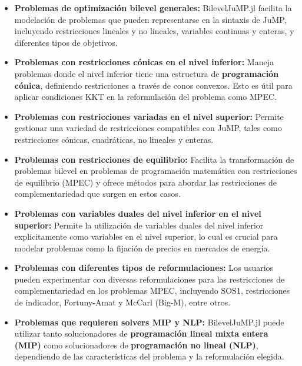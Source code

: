 \begin{itemize}
    \item \textbf{Problemas de optimización bilevel generales:} BilevelJuMP.jl facilita la modelación de problemas que pueden representarse en la sintaxis de JuMP, incluyendo restricciones lineales y no lineales, variables continuas y enteras, y diferentes tipos de objetivos.
    
    \item \textbf{Problemas con restricciones cónicas en el nivel inferior:} Maneja problemas donde el nivel inferior tiene una estructura de \textbf{programación cónica}, definiendo restricciones a través de conos convexos. Esto es útil para aplicar condiciones KKT en la reformulación del problema como MPEC.
    
    \item \textbf{Problemas con restricciones variadas en el nivel superior:} Permite gestionar una variedad de restricciones compatibles con JuMP, tales como restricciones cónicas, cuadráticas, no lineales y enteras.
    
    \item \textbf{Problemas con restricciones de equilibrio:} Facilita la transformación de problemas bilevel en problemas de programación matemática con restricciones de equilibrio (MPEC) y ofrece métodos para abordar las restricciones de complementariedad que surgen en estos casos.
    
    \item \textbf{Problemas con variables duales del nivel inferior en el nivel superior:} Permite la utilización de variables duales del nivel inferior explícitamente como variables en el nivel superior, lo cual es crucial para modelar problemas como la fijación de precios en mercados de energía.
    
    \item \textbf{Problemas con diferentes tipos de reformulaciones:} Los usuarios pueden experimentar con diversas reformulaciones para las restricciones de complementariedad en los problemas MPEC, incluyendo SOS1, restricciones de indicador, Fortuny-Amat y McCarl (Big-M), entre otros.
    
    \item \textbf{Problemas que requieren solvers MIP y NLP:} BilevelJuMP.jl puede utilizar tanto solucionadores de \textbf{programación lineal mixta entera (MIP)} como solucionadores de \textbf{programación no lineal (NLP)}, dependiendo de las características del problema y la reformulación elegida.
\end{itemize}

